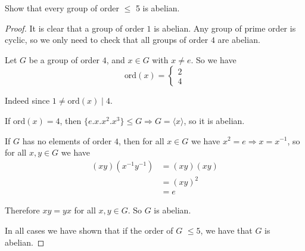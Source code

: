     \begin{exercise}
        Show that every group of order $\leq$ 5 is abelian.

        \begin{proof}
            It is clear that a group of order $1$ is abelian. Any group of prime order is cyclic, so we only need to check that all groups of order $4$ are abelian.

            Let $G$ be a group of order $4$, and $x\in G$ with $x\neq e$. So we have \[\text{ord}(x) = \begin{cases}
                2\\
                4
            \end{cases}\]

            Indeed since $1\neq \text{ord}(x)\mid 4$.

            If $\text{ord}(x) = 4$, then $\{e.x.x^2.x^3\} \leq G \Rightarrow G = \langle x \rangle$, so it is abelian. 

            If $G$ has no elements of order $4$, then for all $x\in G$ we have $x^2 = e \Rightarrow x = x^{-1}$, so for all $x,y\in G$ we have\begin{align*}
                (xy)(x^{-1}y^{-1}) &= (xy)(xy)\\
                                   &= {(xy)}^2\\
                                   &= e
            \end{align*}

            Therefore $xy = yx$ for all $x,y\in G$. So $G$ is abelian.

            In all cases we have shown that if the order of $G$ $\leq 5$, we have that $G$ is abelian. 
        \end{proof}
    \end{exercise}

